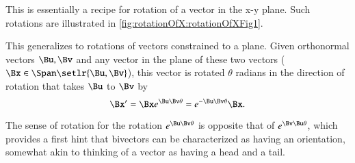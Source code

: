 This is essentially a recipe for rotation of a vector in the x-y plane.
Such rotations are
illustrated in \cref{fig:rotationOfX:rotationOfXFig1}.

This generalizes to rotations of  vectors constrained to a plane.
Given orthonormal vectors \( \Bu, \Bv \) and any vector in the plane of these two vectors (\( \Bx \in \Span\setlr{\Bu,\Bv} \)), this vector is rotated \( \theta \) radians in the direction of rotation that takes \( \Bu \) to \( \Bv \) by
\begin{equation}\label{eqn:2dRotations:1160}
\Bx' = \Bx e^{ \Bu \Bv \theta } = e^{-\Bu \Bv \theta} \Bx.
\end{equation}

The sense of rotation for the rotation \( e^{ \Bu \Bv \theta} \) is opposite that of \( e^{\Bv \Bu \theta} \), which provides a first hint that bivectors can be characterized as having an orientation, somewhat akin to thinking of a vector as having a head and a tail.

